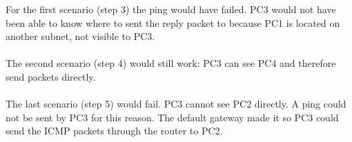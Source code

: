 For the first scenario (step 3) the ping would have failed. PC3 would not have been able to know where to sent the reply packet to because PC1 is located on another subnet, not visible to PC3. \\ \\
The second scenario (step 4) would still work: PC3 can see PC4 and therefore send packets directly. \\ \\
The last scenario (step 5) would fail. PC3 cannot see PC2 directly. A ping could not be sent by PC3 for this reason. The default gateway made it so PC3 could send the ICMP packets through the router to PC2.
